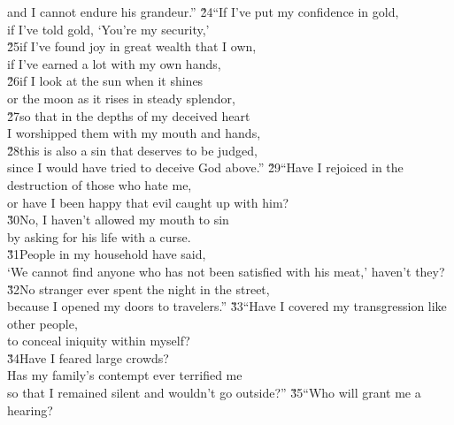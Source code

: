 \begin{poetry}
\poemll    and I cannot endure his grandeur.''
\poeml \v{24}``If I've put my confidence in gold, \\
\poemll    if I've told gold, `You're my security,' \\
\poeml \v{25}if I've found joy in great wealth that I own, \\
\poemll    if I've earned a lot with my own hands, \\
\poeml \v{26}if I look at the sun when it shines \\
\poemll    or the moon as it rises in steady splendor, \\
\poeml \v{27}so that in the depths of my deceived heart \\
\poemll    I worshipped them with my mouth and hands, \\
\poeml \v{28}this is also a sin that deserves to be judged, \\
\poemll    since I would have tried to deceive God above.''
\poeml \v{29}``Have I rejoiced in the destruction of those who hate me, \\
\poemll    or have I been happy that evil caught up with him? \\
\poeml \v{30}No, I haven't allowed my mouth to sin \\
\poemll    by asking for his life with a curse. \\
\poeml \v{31}People in my household have said, \\
\poemll    `We cannot find anyone who has not been satisfied with his meat,' haven't they? \\
\poeml \v{32}No stranger ever spent the night in the street, \\
\poemll    because I opened my doors to travelers.''
\poeml \v{33}``Have I covered my transgression like other people, \\
\poemll    to conceal iniquity within myself? \\
\poeml \v{34}Have I feared large crowds? \\
\poemll    Has my family's contempt ever terrified me \\
\poemlll       so that I remained silent and wouldn't go outside?''
\poeml \v{35}``Who will grant me a hearing? \\

\end{poetry}
